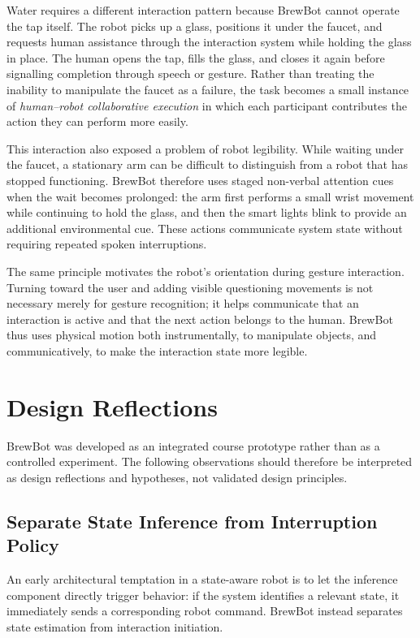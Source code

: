 Water requires a different interaction pattern because BrewBot cannot operate 
the tap itself. The robot picks up a glass, positions it under the faucet, and 
requests human assistance through the interaction system while holding the glass 
in place. The human opens the tap, fills the glass, and closes it again before 
signalling completion through speech or gesture. Rather than treating the 
inability to manipulate the faucet as a failure, the task becomes a small 
instance of \emph{human--robot collaborative execution} in which each participant
contributes the action they can perform more easily.

This interaction also exposed a problem of robot legibility. While waiting under
the faucet, a stationary arm can be difficult to distinguish from a robot that
has stopped functioning. BrewBot therefore uses staged non-verbal attention cues 
when the wait becomes prolonged: the arm first performs a small wrist movement 
while continuing to hold the glass, and then the smart lights blink to provide 
an additional environmental cue. These actions communicate system state without 
requiring repeated spoken interruptions.

The same principle motivates the robot's orientation during gesture
interaction. Turning toward the user and adding visible questioning movements is
not necessary merely for gesture recognition; it helps communicate that an
interaction is active and that the next action belongs to the human. BrewBot
thus uses physical motion both instrumentally, to manipulate objects, and
communicatively, to make the interaction state more legible.

\section{Design Reflections}

BrewBot was developed as an integrated course prototype rather than as a
controlled experiment. The following observations should therefore be
interpreted as design reflections and hypotheses, not validated design
principles.

\subsection{Separate State Inference from Interruption Policy}

An early architectural temptation in a state-aware robot is to let the inference
component directly trigger behavior: if the system identifies a relevant state,
it immediately sends a corresponding robot command. BrewBot instead separates
state estimation from interaction initiation.

